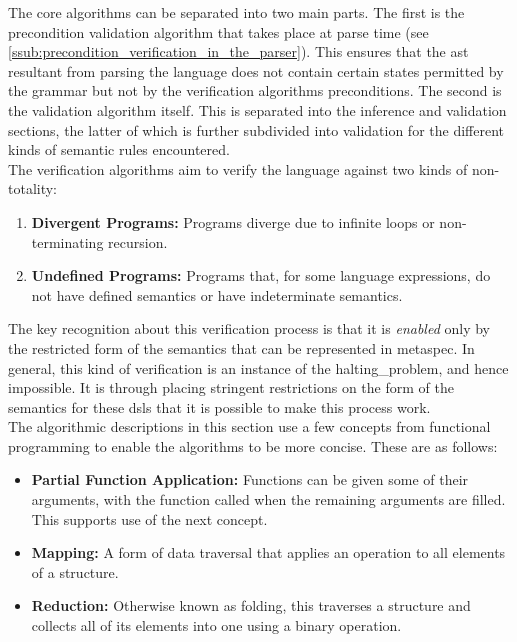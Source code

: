 The core algorithms can be separated into two main parts.
The first is the precondition validation algorithm that takes place at parse time (see \autoref{ssub:precondition_verification_in_the_parser}).
This ensures that the \gls{ast} resultant from parsing the language does not contain certain states permitted by the grammar but not by the verification algorithms preconditions. 
The second is the validation algorithm itself.
This is separated into the inference and validation sections, the latter of which is further subdivided into validation for the different kinds of semantic rules encountered. \\

The verification algorithms aim to verify the language against two kinds of non-totality:
\begin{enumerate}
    \item \textbf{Divergent Programs:} Programs \gls{diverge} due to infinite loops or non-terminating recursion.
    \item \textbf{Undefined Programs:} Programs that, for some language expressions, do not have defined semantics or have indeterminate semantics.
\end{enumerate}

The key recognition about this verification process is that it is \textit{enabled} only by the restricted form of the semantics that can be represented in \gls{metaspec}.
In general, this kind of verification is an instance of the \gls{halting_problem}, and hence impossible.
It is through placing stringent restrictions on the form of the semantics for these \glspl{dsl} that it is possible to make this process work. \\

The algorithmic descriptions in this section use a few concepts from functional programming to enable the algorithms to be more concise.
These are as follows:
\begin{itemize}
    \item \textbf{Partial Function Application:} Functions can be given some of their arguments, with the function called when the remaining arguments are filled.
    This supports use of the next concept.
    \item \textbf{Mapping:} A form of data traversal that applies an operation to all elements of a structure.
    \item \textbf{Reduction:} Otherwise known as folding, this traverses a structure and collects all of its elements into one using a binary operation. 
\end{itemize}

